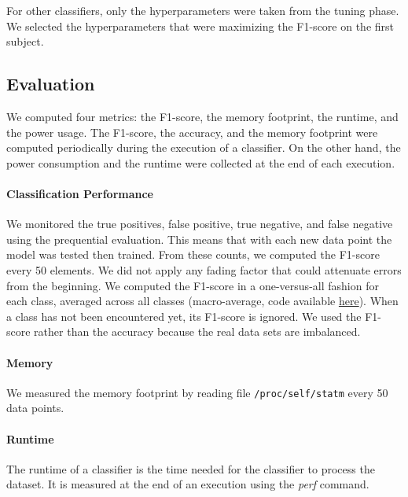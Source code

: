 For other classifiers, only the 
hyperparameters were taken from the tuning phase.
We selected the hyperparameters that were
maximizing the F1-score on the first subject.


\subsection{Evaluation}
We computed four metrics: the F1-score, the memory
footprint, the runtime, and the power usage.
The F1-score, the accuracy, and the memory
footprint were computed periodically during the
execution of a classifier. On the other hand, the
power consumption and the runtime were collected
at the end of each execution.

\paragraph{Classification Performance}
We monitored the true positives, false positive,
true negative, and false negative using the
prequential evaluation. This means that with each
new data point the model was tested then trained.
From these counts, we computed the F1-score every
50 elements. We did not apply any fading factor
that could attenuate errors from the beginning.
We computed the F1-score in a one-versus-all
fashion for each class, averaged across all
classes
(macro-average, code available \href{https://github.com/azazel7/paper-benchmark/blob/9adb1039c5a65a00a66d554f0e870d14d3fff7cb/main.cpp\#L82}{here}).  When a class has not been encountered yet, its F1-score is ignored.
We used the F1-score rather than the accuracy
because the real data sets are imbalanced.

\paragraph{Memory}
We measured the memory footprint by reading file
\texttt{/proc/self/statm} every 50 data points.

\paragraph{Runtime}
The runtime of a classifier is the time needed for
the classifier to process the dataset. It is
measured at the end of an execution using the
\textit{perf}
command.


